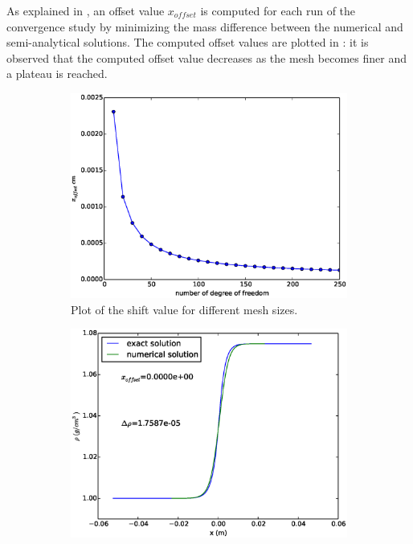 \documentclass[times,doublespace]{fldauth}%
\begin{document}
As explained in , an offset value $x_{offset}$ is computed for each run of the convergence study by minimizing the mass difference between the numerical and semi-analytical solutions. The computed offset values are plotted in : it is observed that the computed offset value decreases as the mesh becomes finer and a plateau is reached. 
%
\begin{figure}[H]
    \begin{subfigure}{0.33\textwidth}
    \centering
    \includegraphics[width=\linewidth]{figures/cst-xs/mach-1p05-x-offset.eps}
    \caption{Plot of the shift value for different mesh sizes.}\label{fig:mach-1p05-x-offset}
    \end{subfigure}
    \begin{subfigure}{0.33\textwidth}
    \centering
    \includegraphics[width=\linewidth]{figures/cst-xs/mach-1p05-density-nel-50-zero-shift.eps}

\end{subfigure}
\end{figure}
\end{document}

